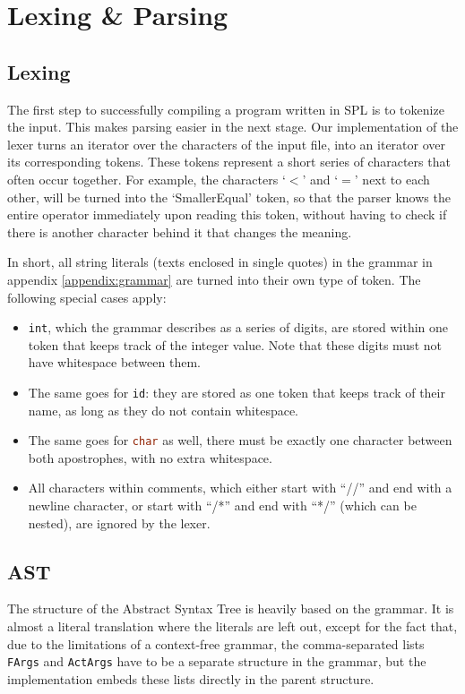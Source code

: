 \chapter{Lexing \& Parsing}

\section{Lexing}
The first step to successfully compiling a program written in SPL is to tokenize the input. This makes parsing easier in the next stage. Our implementation of the lexer turns an iterator over the characters of the input file, into an iterator over its corresponding tokens. These tokens represent a short series of characters that often occur together. For example, the characters `$<$' and `$=$' next to each other, will be turned into the `SmallerEqual' token, so that the parser knows the entire operator immediately upon reading this token, without having to check if there is another character behind it that changes the meaning.

In short, all string literals (texts enclosed in single quotes) in the grammar in appendix \ref{appendix:grammar} are turned into their own type of token. The following special cases apply:

\begin{itemize}
    \item \lstinline[language=rust]|int|, which the grammar describes as a series of digits, are stored within one token that keeps track of the integer value. Note that these digits must not have whitespace between them.
    \item The same goes for \lstinline[language=rust]|id|: they are stored as one token that keeps track of their name, as long as they do not contain whitespace.
    \item The same goes for \lstinline[language=rust]|char| as well, there must be exactly one character between both apostrophes, with no extra whitespace.
    \item All characters within comments, which either start with ``//'' and end with a newline character, or start with ``/*'' and end with ``*/'' (which can be nested), are ignored by the lexer.
\end{itemize}

\section{AST}
The structure of the Abstract Syntax Tree is heavily based on the grammar. It is almost a literal translation where the literals are left out, except for the fact that, due to the limitations of a context-free grammar, the comma-separated lists \lstinline[language=rust]|FArgs| and \lstinline[language=rust]|ActArgs| have to be a separate structure in the grammar, but the implementation embeds these lists directly in the parent structure.


